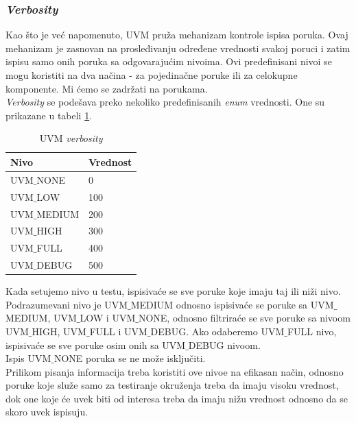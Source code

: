 \subsubsection{\emph{Verbosity}}

Kao što je već napomenuto, UVM pruža mehanizam kontrole ispisa poruka. Ovaj
mehanizam je zasnovan na prosleđivanju određene vrednosti svakoj poruci i
zatim ispisu samo onih poruka sa odgovarajućim nivoima. Ovi predefinisani nivoi
se mogu koristiti na dva načina - za pojedinačne poruke ili za celokupne
komponente. Mi ćemo se zadržati na porukama.\\

\emph{Verbosity} se podešava preko nekoliko predefinisanih \emph{enum}
vrednosti. One su prikazane u tabeli \ref{tab:uvm_verbosity}.\\

\begin{table}[h!]
  \centering
  \begin{tabular}{|l|l|}
    \hline
    \textbf{Nivo} & \textbf{Vrednost}\\
    \hline
    UVM\(\_\)NONE & 0\\
    \hline
    UVM\(\_\)LOW & 100\\
    \hline
    UVM\(\_\)MEDIUM & 200\\
    \hline
    UVM\(\_\)HIGH & 300\\
    \hline
    UVM\(\_\)FULL & 400\\
    \hline
    UVM\(\_\)DEBUG & 500\\
    \hline
  \end{tabular}
  \caption{UVM \emph{verbosity}}
  \label{tab:uvm_verbosity}
\end{table}

Kada setujemo nivo u testu, ispisivaće se sve poruke koje imaju taj ili niži
nivo. Podrazumevani nivo je UVM\(\_\)MEDIUM odnosno ispisivaće se poruke sa
UVM\(\_\)MEDIUM, UVM\(\_\)LOW i UVM\(\_\)NONE, odnosno filtriraće se sve poruke
sa nivoom UVM\(\_\)HIGH, UVM\(\_\)FULL i UVM\(\_\)DEBUG. Ako odaberemo
UVM\(\_\)FULL nivo, ispisivaće se sve poruke osim onih sa UVM\(\_\)DEBUG
nivoom.\\

Ispis UVM\(\_\)NONE poruka se ne može isključiti.\\

Prilikom pisanja informacija treba koristiti ove nivoe na efikasan način,
odnosno poruke koje služe samo za testiranje okruženja treba da imaju visoku
vrednost, dok one koje će uvek biti od interesa treba da imaju nižu vrednost
odnosno da se skoro uvek ispisuju.\\

